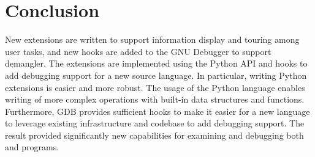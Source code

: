 \chapter{Conclusion}
New extensions are written to support information display and touring among
\uCPPS user tasks, and
new hooks are added to the GNU
Debugger to support \CFAS demangler. The extensions are implemented using the Python API and hooks to add debugging support for a
new source language. In particular, writing Python extensions is easier and more
robust. The usage of the Python language enables writing of
more complex operations with built-in data structures and functions.
Furthermore, GDB provides sufficient hooks to make it easier for a new language to leverage existing
infrastructure and codebase to add debugging support. The result provided
significantly new capabilities for examining and debugging both \uCPPS and \CFAS
programs.

